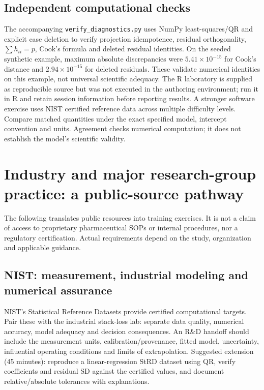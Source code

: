 \documentclass[11pt]{article}
\begin{document}
\subsection{Independent computational checks}
The accompanying \texttt{verify\_diagnostics.py} uses NumPy least-squares/QR and explicit case deletion to verify projection idempotence, residual orthogonality, $\sum h_{ii}=p$, Cook's formula and deleted residual identities. On the seeded synthetic example, maximum absolute discrepancies were $5.41\times10^{-15}$ for Cook's distance and $2.94\times10^{-15}$ for deleted residuals. These validate numerical identities on this example, not universal scientific adequacy. The R laboratory is supplied as reproducible source but was not executed in the authoring environment; run it in R and retain session information before reporting results.
A stronger software exercise uses NIST certified reference data across multiple difficulty levels. Compare matched quantities under the exact specified model, intercept convention and units. Agreement checks numerical computation; it does not establish the model's scientific validity.
\section{Industry and major research-group practice: a public-source pathway}
The following translates public resources into training exercises. It is not a claim of access to proprietary pharmaceutical SOPs or internal procedures, nor a regulatory certification. Actual requirements depend on the study, organization and applicable guidance.
\subsection{NIST: measurement, industrial modeling and numerical assurance}
NIST's Statistical Reference Datasets provide certified computational targets. Pair these with the industrial stack-loss lab: separate data quality, numerical accuracy, model adequacy and decision consequences. An R\&D handoff should include the measurement units, calibration/provenance, fitted model, uncertainty, influential operating conditions and limits of extrapolation. Suggested extension (45 minutes): reproduce a linear-regression StRD dataset using QR, verify coefficients and residual SD against the certified values, and document relative/absolute tolerances with explanations.
\end{document}
